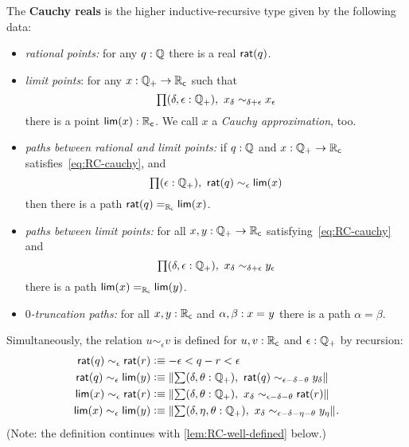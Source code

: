 \begin{defn}\label{defn:cauchy-reals}
  The \textbf{Cauchy reals \RC} is the higher inductive-recursive type given by the
  following data:
  \begin{itemize}
  \item \emph{rational points:} 
    for any $q : \Q$ there is a real $\rcrat(q)$.
  \item \emph{limit points}:
    for any $x : \Qp \to \RC$ such that
    \begin{equation}
      \label{eq:RC-cauchy}
      \prd{\delta, \epsilon : \Qp} x_\delta \sim_{\delta + \epsilon} x_\epsilon
    \end{equation}
    there is a point $\rclim(x) : \RC$. We call $x$ a \emph{Cauchy approximation}, too.
  \item \emph{paths between rational and limit points:}
    if $q : \Q$ and $x : \Qp \to \RC$ satisfies~\eqref{eq:RC-cauchy}, and
    \begin{equation}
      \label{eq:RC-rat-eq-lim}
      \prd{\epsilon : \Qp} \rcrat(q) \sim_{\epsilon} \rclim(x)
    \end{equation}
    then there is a path $\id[\RC]{\rcrat(q)}{\rclim(x)}$.
  \item \emph{paths between limit points:}
    for all $x, y : \Qp \to \RC$ satisfying~\eqref{eq:RC-cauchy} and
    \begin{equation}
      \label{eq:RC-lim-eq-lim}
      \prd{\delta, \epsilon : \Qp} x_\delta \sim_{\delta + \epsilon} y_\epsilon
    \end{equation}
    there is a path $\id[\RC]{\rclim(x)}{\rclim(y)}$.
  \item \emph{$0$-truncation paths:} for all $x, y : \RC$ and $\alpha, \beta : \id{x}{y}$
    there is a path $\alpha = \beta$.
  \end{itemize}
  Simultaneously, the relation $u \sim_\epsilon v$ is defined for $u, v : \RC$ and
  $\epsilon : \Qp$ by recursion:
  \begin{align*}
    \rcrat(q) \sim_\epsilon \rcrat(r)  &\defeq
    -\epsilon < q - r < \epsilon
    \\
    \rcrat(q) \sim_\epsilon \rclim(y) &\defeq
    \brck{\sm{\delta, \theta : \Qp} \rcrat(q) \sim_{\epsilon - \delta - \theta} y_\delta}
    \\
    \rclim(x) \sim_\epsilon \rcrat(r) &\defeq
    \brck{\sm{\delta, \theta : \Qp} x_\delta \sim_{\epsilon - \delta - \theta} \rcrat(r)}
    \\
    \rclim(x) \sim_\epsilon \rclim(y) &\defeq
    \brck{\sm{\delta, \eta, \theta : \Qp} x_\delta \sim_{\epsilon - \delta - \eta - \theta} y_\eta}.
  \end{align*}  
  (Note: the definition continues with \autoref{lem:RC-well-defined} below.)
\end{defn}

